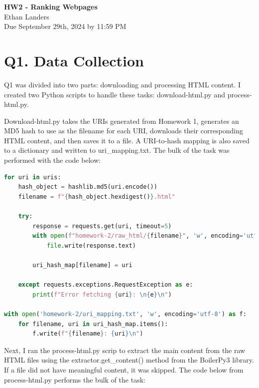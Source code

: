 \documentclass[12pt]{article}
\begin{document}
\begin{centering}
{\large\textbf{HW2 - Ranking Webpages}}\\ 
Ethan Landers\\
Due September 29th, 2024 by 11:59 PM\\
\end{centering}


\section*{Q1. Data Collection}

Q1 was divided into two parts: downloading and processing HTML content. I created two Python scripts to handle these tasks: download-html.py and process-html.py.

Download-html.py takes the URIs generated from Homework 1, generates an MD5 hash to use as the filename for each URI, downloads their corresponding HTML content, and then saves it to a file. A URI-to-hash mapping is also saved to a dictionary and written to uri\_mapping.txt. The bulk of the task was performed with the code below:

\begin{lstlisting}[language=Python, caption=download-html.py, label=lst:copy]
for uri in uris:
    hash_object = hashlib.md5(uri.encode())
    filename = f"{hash_object.hexdigest()}.html"

    try:
        response = requests.get(uri, timeout=5)
        with open(f"homework-2/raw_html/{filename}", 'w', encoding='utf-8') as file:
            file.write(response.text)

        uri_hash_map[filename] = uri

    except requests.exceptions.RequestException as e:
        print(f"Error fetching {uri}: \n{e}\n")

with open('homework-2/uri_mapping.txt', 'w', encoding='utf-8') as f:
    for filename, uri in uri_hash_map.items():
        f.write(f"{filename}: {uri}\n")
\end{lstlisting}

Next, I ran the process-html.py scrip to extract the main content from the raw HTML files using the extractor.get\_content() method from the BoilerPy3 library. If a file did not have meaningful content, it was skipped. The code below from process-html.py performs the bulk of the task:
\end{document}
